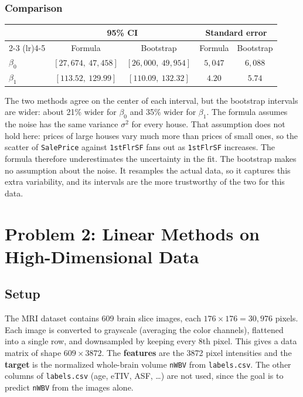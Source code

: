 \documentclass[11pt]{article}
\begin{document}
\subsubsection*{Comparison}

\begin{center}
\begin{tabular}{lcccc}
\toprule
 & \multicolumn{2}{c}{95\% CI} & \multicolumn{2}{c}{Standard error} \\
\cmidrule(lr){2-3} \cmidrule(lr){4-5}
 & Formula & Bootstrap & Formula & Bootstrap \\
\midrule
$\beta_0$ & $[27{,}674,\ 47{,}458]$ & $[26{,}000,\ 49{,}954]$ & $5{,}047$ & $6{,}088$ \\
$\beta_1$ & $[113.52,\ 129.99]$     & $[110.09,\ 132.32]$     & $4.20$    & $5.74$    \\
\bottomrule
\end{tabular}
\end{center}

The two methods agree on the center of each interval, but the bootstrap intervals
are wider: about 21\% wider for $\beta_0$ and 35\% wider for $\beta_1$. The formula
assumes the noise has the same variance $\sigma^2$ for every house. That assumption
does not hold here: prices of large houses vary much more than prices of small ones,
so the scatter of \texttt{SalePrice} against \texttt{1stFlrSF} fans out as
\texttt{1stFlrSF} increases. The formula therefore underestimates the uncertainty in the
fit. The bootstrap makes no assumption about the noise. It resamples the actual data,
so it captures this extra variability, and its intervals are the more trustworthy of
the two for this data.

\clearpage
\section*{Problem 2: Linear Methods on High-Dimensional Data}

\subsection*{Setup}

The MRI dataset contains 609 brain slice images, each $176 \times 176 = 30{,}976$
pixels. Each image is converted to grayscale (averaging the color channels), flattened
into a single row, and downsampled by keeping every 8th pixel. This gives a data matrix of
shape $609 \times 3872$. The \textbf{features} are the 3872 pixel intensities and the
\textbf{target} is the normalized whole-brain volume \texttt{nWBV} from
\texttt{labels.csv}. The other columns of \texttt{labels.csv} (age, eTIV, ASF, \dots) are
not used, since the goal is to predict \texttt{nWBV} from the images alone.
\end{document}
